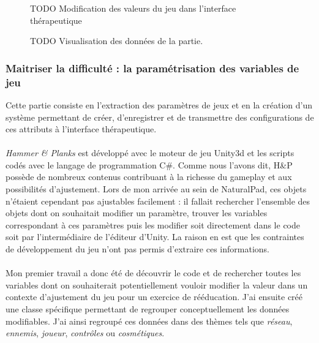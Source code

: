 \begin{figure}[htbp]
	\centering
	\caption{TODO Modification des valeurs du jeu dans l'interface thérapeutique}
	\label{interface_therapeutique_01}
\end{figure}

\begin{figure}[htbp]
	\centering
	\caption{TODO Visualisation des données de la partie.}
	\label{interface_therapeutique_02}
\end{figure}

	\subsubsection*{Maitriser la difficulté : la paramétrisation des variables de jeu}
Cette partie consiste en l'extraction des paramètres de jeux et en la création d'un système permettant de créer, d'enregistrer et de transmettre des configurations de ces attributs à l'interface thérapeutique.

\paragraph{}
\emph{Hammer \& Planks} est développé avec le moteur de jeu Unity3d et les scripts codés avec le langage de programmation C\#. Comme nous l'avons dit, H\&P possède de nombreux contenus contribuant à la richesse du gameplay et aux possibilités d'ajustement. Lors de mon arrivée au sein de NaturalPad, ces objets n'étaient cependant pas ajustables facilement : il fallait rechercher l'ensemble des objets dont on souhaitait modifier un paramètre, trouver les variables correspondant à ces paramètres puis les modifier soit directement dans le code soit par l'intermédiaire de l'éditeur d'Unity. La raison en est que les contraintes de développement du jeu n'ont pas permis d'extraire ces informations.

\paragraph{}
Mon premier travail a donc été de découvrir le code et de rechercher toutes les variables dont on souhaiterait potentiellement vouloir modifier la valeur dans un contexte d'ajustement du jeu pour un exercice de rééducation. J'ai ensuite créé une classe spécifique permettant de regrouper conceptuellement les données modifiables. J'ai ainsi regroupé ces données dans des thèmes tels que \emph{réseau}, \emph{ennemis}, \emph{joueur}, \emph{contrôles} ou \emph{cosmétiques}.

